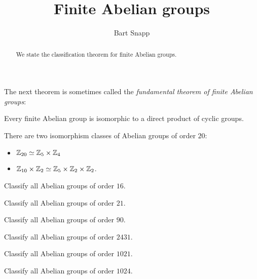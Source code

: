 \documentclass{ximera}
\author{Bart Snapp}
\title{Finite Abelian groups}
\begin{document}
\begin{abstract}
  We state the classification theorem for finite Abelian groups.
\end{abstract}
\maketitle


The next theorem is sometimes called the \textit{fundamental theorem
  of finite Abelian groups}:

\begin{theorem}
  Every finite Abelian group is isomorphic to a direct product of
  cyclic groups.
\end{theorem}



\begin{example}
  There are two isomorphism classes of Abelian groups of order $20$:
  \begin{itemize}
  \item $\mathbb Z_{20}\simeq \mathbb Z_{5}\times \mathbb Z_4$
  \item $\mathbb Z_{10}\times\mathbb Z_2\simeq \mathbb Z_5\times \mathbb Z_2\times \mathbb Z_2$.
  \end{itemize}
\end{example}



\begin{exercise}
  Classify all Abelian groups of order $16$.
\end{exercise}

\begin{exercise}
  Classify all Abelian groups of order $21$.
\end{exercise}

\begin{exercise}
  Classify all Abelian groups of order $90$.
\end{exercise}


\begin{exercise}
  Classify all Abelian groups of order $2431$.
\end{exercise}

\begin{exercise}
  Classify all Abelian groups of order $1021$.
\end{exercise}

\begin{exercise}
  Classify all Abelian groups of order $1024$.
\end{exercise}
\end{document}
